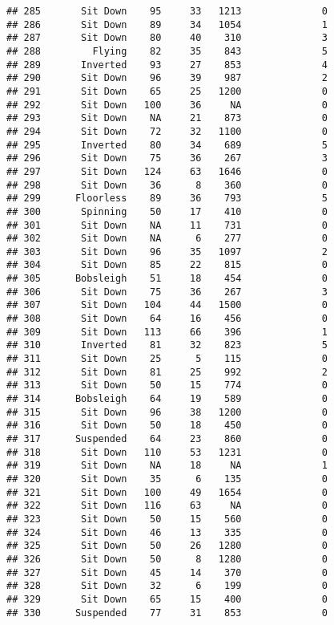 \documentclass[
]{article}
\begin{document}
\begin{verbatim}
## 285       Sit Down    95     33   1213              0
## 286       Sit Down    89     34   1054              1
## 287       Sit Down    80     40    310              3
## 288         Flying    82     35    843              5
## 289       Inverted    93     27    853              4
## 290       Sit Down    96     39    987              2
## 291       Sit Down    65     25   1200              0
## 292       Sit Down   100     36     NA              0
## 293       Sit Down    NA     21    873              0
## 294       Sit Down    72     32   1100              0
## 295       Inverted    80     34    689              5
## 296       Sit Down    75     36    267              3
## 297       Sit Down   124     63   1646              0
## 298       Sit Down    36      8    360              0
## 299      Floorless    89     36    793              5
## 300       Spinning    50     17    410              0
## 301       Sit Down    NA     11    731              0
## 302       Sit Down    NA      6    277              0
## 303       Sit Down    96     35   1097              2
## 304       Sit Down    85     22    815              0
## 305      Bobsleigh    51     18    454              0
## 306       Sit Down    75     36    267              3
## 307       Sit Down   104     44   1500              0
## 308       Sit Down    64     16    456              0
## 309       Sit Down   113     66    396              1
## 310       Inverted    81     32    823              5
## 311       Sit Down    25      5    115              0
## 312       Sit Down    81     25    992              2
## 313       Sit Down    50     15    774              0
## 314      Bobsleigh    64     19    589              0
## 315       Sit Down    96     38   1200              0
## 316       Sit Down    50     18    450              0
## 317      Suspended    64     23    860              0
## 318       Sit Down   110     53   1231              0
## 319       Sit Down    NA     18     NA              1
## 320       Sit Down    35      6    135              0
## 321       Sit Down   100     49   1654              0
## 322       Sit Down   116     63     NA              0
## 323       Sit Down    50     15    560              0
## 324       Sit Down    46     13    335              0
## 325       Sit Down    50     26   1280              0
## 326       Sit Down    50      8   1280              0
## 327       Sit Down    45     14    370              0
## 328       Sit Down    32      6    199              0
## 329       Sit Down    65     15    400              0
## 330      Suspended    77     31    853              0

\end{verbatim}
\end{document}
